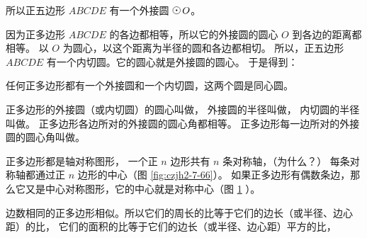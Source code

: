所以正五边形 $ABCDE$ 有一个外接圆 $\yuan\,O$。

因为正多边形 $ABCDE$ 的各边都相等，所以它的外接圆的圆心 $O$ 到各边的距离都相等。
以 $O$ 为圆心，以这个距离为半径的圆和各边都相切。
所以，正五边形 $ABCDE$ 有一个内切圆。它的圆心就是外接圆的圆心。 于是得到：

\begin{dingli}[定理]
    任何正多边形都有一个外接圆和一个内切圆，这两个圆是同心圆。
\end{dingli}

正多边形的外接圆（或内切圆）的圆心叫做，
外接圆的半径叫做，
内切圆的半径叫做。
正多边形各边所对的外接圆的圆心角都相等。
正多边形每一边所对的外接圆的圆心角叫做。

\begin{figure}[htbp]
    \centering
    \begin{minipage}[b]{7cm}
        \centering
        
        \caption{}\label{fig:czjh2-7-66}
    \end{minipage}
    \qquad
    \begin{minipage}[b]{7cm}
        \centering
        
        \caption{}\label{fig:czjh2-7-67}
    \end{minipage}
\end{figure}

正多边形都是轴对称图形， 一个正 $n$ 边形共有 $n$ 条对称轴，（为什么？）
每条对称轴都通过正 $n$ 边形的中心（图 \ref{fig:czjh2-7-66}）。
如果正多边形有偶数条边，那么它又是中心对称图形，它的中心就是对称中心（图 \ref{fig:czjh2-7-67} ）。

边数相同的正多边形相似。所以它们的周长的比等于它们的边长（或半径、边心距）的比，
它们的面积的比等于它们的边长（或半径、边心距）平方的比，


\begin{lianxi}


\begin{xiaoxiaotis}



\end{xiaoxiaotis}


\begin{enhancedline}
\begin{xiaoxiaotis}


\end{xiaoxiaotis}

\end{enhancedline}

\end{lianxi}

